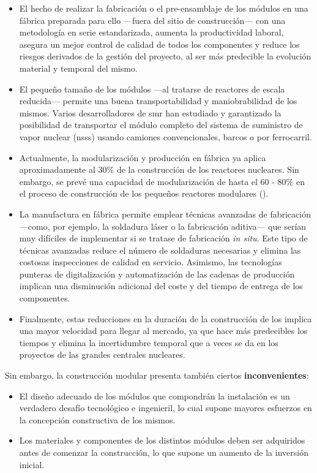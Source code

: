 \begin{itemize}
  \item El hecho de realizar la fabricación o el pre-ensamblaje de los módulos en una fábrica preparada para ello ---fuera del sitio de construcción--- con una metodología en serie estandarizada, aumenta la productividad laboral, asegura un mejor control de calidad de todos los componentes y reduce los riesgos derivados de la gestión del proyecto, al ser más predecible la evolución material y temporal del mismo.
  \item El pequeño tamaño de los módulos ---al tratarse de reactores de escala reducida--- permite una buena transportabilidad y maniobrabilidad de los mismos. Varios desarrolladores de \acrshort{smr} han estudiado y garantizado la posibilidad de transportar el módulo completo del sistema de suministro de vapor nuclear (\acrshort{nsss}) usando camiones convencionales, barcos o por ferrocarril.
  \item Actualmente, la modularización y producción en fábrica ya aplica aproximadamente al 30\% de la construcción de los reactores nucleares. Sin embargo, se prevé una capacidad de modularización de hasta el 60 - 80\% en el proceso de construcción de los pequeños reactores modulares (\cite{nea_unlocking_2020}).
  \item La manufactura en fábrica permite emplear técnicas avanzadas de fabricación ---como, por ejemplo, la soldadura láser o la fabricación aditiva--- que serían muy difíciles de implementar si se tratase de fabricación \emph{in situ}. Este tipo de técnicas avanzadas reduce el número de soldaduras necesarias y elimina las costosas inspecciones de calidad en servicio. Asimismo, las tecnologías punteras de digitalización y automatización de las cadenas de producción implican una disminución adicional del coste y del tiempo de entrega de los componentes.
  \item Finalmente, estas reducciones en la duración de la construcción de los  implica una mayor velocidad para llegar al mercado, ya que hace más predecibles los tiempos y elimina la incertidumbre temporal que a veces se da en los proyectos de las grandes centrales nucleares.
\end{itemize}

Sin embargo, la construcción modular presenta también ciertos \textbf{inconvenientes}:

\begin{itemize}
  \item El diseño adecuado de los módulos que compondrán la instalación es un verdadero desafío tecnológico e ingenieril, lo cual supone mayores esfuerzos en la concepción constructiva de los mismos.
  \item Los materiales y componentes de los distintos módulos deben ser adquiridos antes de comenzar la construcción, lo que supone un aumento de la inversión inicial.
\end{itemize}

